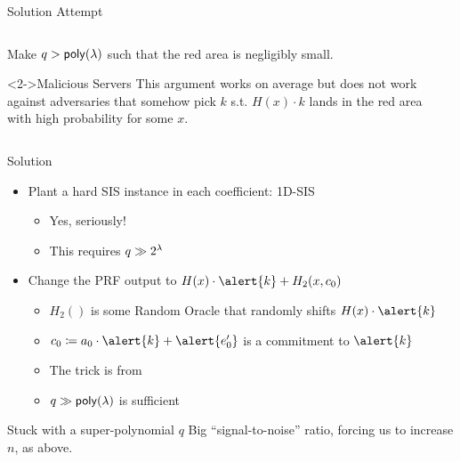 \documentclass[xcolor=table,10pt,aspectratio=169]{beamer}
\begin{document}
\begin{frame}[label={sec:org055a757}]{Solution Attempt}
\begin{columns}
\begin{column}{0.5\columnwidth}
Make \(q > \poly\) such that the red area is negligibly small.
\begin{block}<2->{Malicious Servers}
This argument works on average but does not work against adversaries that somehow pick \(k\) s.t. \(H(x) \cdot k\) lands in the red area with high probability for some \(x\).
\end{block}
\end{column}
\begin{column}{0.5\columnwidth}
\end{column}
\end{columns}
\end{frame}
\begin{frame}[label={sec:org0186f84}]{Solution}
\begin{itemize}
\item Plant a hard SIS instance in each coefficient: 1D-SIS \cite{PKC:ADDS21}
\pause
\begin{itemize}
\item Yes, seriously!
\item This requires \(q \gg 2^{\lambda}\)
\end{itemize}
\pause
\item Change the PRF output to \(H(x) \cdot \alert{k} + H_{2}(x,c_0)\) \cite{AC:AlbGur24}
\begin{itemize}
\item \(H_{2}()\) is some Random Oracle that randomly shifts \(H(x) \cdot \alert{k}\)
\item \(c_{0} \coloneqq a_{0} \cdot \alert{k} + \alert{e_{0}'}\) is a commitment to \(\alert{k}\)
\item The trick is from \cite{USENIX:GKQMS24}
\item \(q \gg \poly\) is sufficient
\end{itemize}
\end{itemize}
\begin{block}{Stuck with a super-polynomial \(q\)}
Big ``signal-to-noise'' ratio, forcing us to increase \(n\), as above.
\end{block}
\end{frame}
\end{document}
